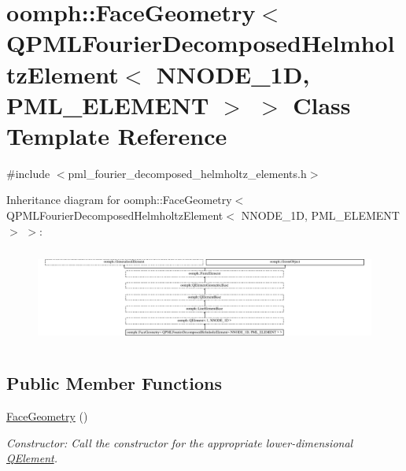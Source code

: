 \hypertarget{classoomph_1_1FaceGeometry_3_01QPMLFourierDecomposedHelmholtzElement_3_01NNODE__1D_00_01PML__ELEMENT_01_4_01_4}{}\section{oomph\+:\+:Face\+Geometry$<$ Q\+P\+M\+L\+Fourier\+Decomposed\+Helmholtz\+Element$<$ N\+N\+O\+D\+E\+\_\+1D, P\+M\+L\+\_\+\+E\+L\+E\+M\+E\+NT $>$ $>$ Class Template Reference}
\label{classoomph_1_1FaceGeometry_3_01QPMLFourierDecomposedHelmholtzElement_3_01NNODE__1D_00_01PML__ELEMENT_01_4_01_4}


{\ttfamily \#include $<$pml\+\_\+fourier\+\_\+decomposed\+\_\+helmholtz\+\_\+elements.\+h$>$}

Inheritance diagram for oomph\+:\+:Face\+Geometry$<$ Q\+P\+M\+L\+Fourier\+Decomposed\+Helmholtz\+Element$<$ N\+N\+O\+D\+E\+\_\+1D, P\+M\+L\+\_\+\+E\+L\+E\+M\+E\+NT $>$ $>$\+:\begin{figure}[H]
\begin{center}
\leavevmode
\includegraphics[height=3.207856cm]{classoomph_1_1FaceGeometry_3_01QPMLFourierDecomposedHelmholtzElement_3_01NNODE__1D_00_01PML__ELEMENT_01_4_01_4}
\end{center}
\end{figure}
\subsection*{Public Member Functions}
\begin{DoxyCompactItemize}
\item 
\hyperlink{classoomph_1_1FaceGeometry_3_01QPMLFourierDecomposedHelmholtzElement_3_01NNODE__1D_00_01PML__ELEMENT_01_4_01_4_ab5d41d63a4775010c7c73ae99d2b10ae}{Face\+Geometry} ()
\begin{DoxyCompactList}\small\item\em Constructor\+: Call the constructor for the appropriate lower-\/dimensional \hyperlink{classoomph_1_1QElement}{Q\+Element}. \end{DoxyCompactList}\end{DoxyCompactItemize}
